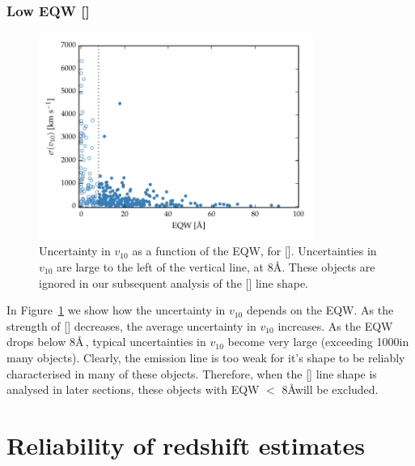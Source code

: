 \subsubsection{Low EQW []}

\begin{figure}
    \centering
    \includegraphics[width=0.8\textwidth]{figures/chapter04/eqw_cut.pdf} 
    \caption[{Uncertainty in $v_{10}$ as a function of the EQW, for [].}]{Uncertainty in $v_{10}$ as a function of the EQW, for []. Uncertainties in $v_{10}$ are large to the left of the vertical line, at 8\AA. These objects are ignored in our subsequent analysis of the [] line shape.}     
    \label{fig:eqw_cut}
\end{figure}

In Figure~\ref{fig:eqw_cut} we show how the uncertainty in $v_{10}$ depends on the EQW. 
As the strength of [] decreases, the average uncertainty in $v_{10}$ increases. 
As the EQW drops below 8\AA\,, typical uncertainties in $v_{10}$ become very large (exceeding 1000\kms in many objects). 
Clearly, the emission line is too weak for it's shape to be reliably characterised in many of these objects. 
Therefore, when the [] line shape is analysed in later sections, these objects with EQW $<$ 8\AA will be excluded.

\section{Reliability of redshift estimates}

